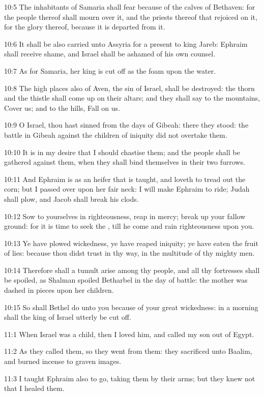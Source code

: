 10:5 The inhabitants of Samaria shall fear because of the calves of
Bethaven: for the people thereof shall mourn over it, and the priests
thereof that rejoiced on it, for the glory thereof, because it is
departed from it.

10:6 It shall be also carried unto Assyria for a present to king
Jareb: Ephraim shall receive shame, and Israel shall be ashamed of his
own counsel.

10:7 As for Samaria, her king is cut off as the foam upon the water.

10:8 The high places also of Aven, the sin of Israel, shall be
destroyed: the thorn and the thistle shall come up on their altars;
and they shall say to the mountains, Cover us; and to the hills, Fall
on us.

10:9 O Israel, thou hast sinned from the days of Gibeah: there they
stood: the battle in Gibeah against the children of iniquity did not
overtake them.

10:10 It is in my desire that I should chastise them; and the people
shall be gathered against them, when they shall bind themselves in
their two furrows.

10:11 And Ephraim is as an heifer that is taught, and loveth to tread
out the corn; but I passed over upon her fair neck: I will make
Ephraim to ride; Judah shall plow, and Jacob shall break his clods.

10:12 Sow to yourselves in righteousness, reap in mercy; break up your
fallow ground: for it is time to seek the \LORD, till he come and rain
righteousness upon you.

10:13 Ye have plowed wickedness, ye have reaped iniquity; ye have
eaten the fruit of lies: because thou didst trust in thy way, in the
multitude of thy mighty men.

10:14 Therefore shall a tumult arise among thy people, and all thy
fortresses shall be spoiled, as Shalman spoiled Betharbel in the day
of battle: the mother was dashed in pieces upon her children.

10:15 So shall Bethel do unto you because of your great wickedness: in
a morning shall the king of Israel utterly be cut off.

11:1 When Israel was a child, then I loved him, and called my son out
of Egypt.

11:2 As they called them, so they went from them: they sacrificed unto
Baalim, and burned incense to graven images.

11:3 I taught Ephraim also to go, taking them by their arms; but they
knew not that I healed them.

